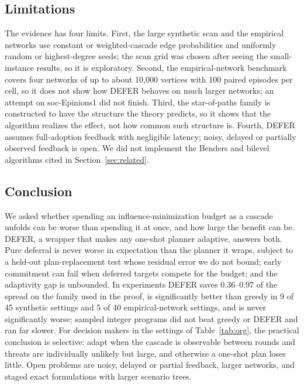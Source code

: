 \documentclass[preprint,11pt]{elsarticle}
\theoremstyle{definition}
\theoremstyle{remark}
\begin{document}
\subsection{Limitations}\label{sec:limitations}

The evidence has four limits. First, the large synthetic scan and the empirical networks use constant or weighted-cascade edge probabilities and uniformly random or highest-degree seeds; the scan grid was chosen after seeing the small-instance results, so it is exploratory. Second, the empirical-network benchmark covers four networks of up to about 10,000 vertices with 100 paired episodes per cell, so it does not show how DEFER behaves on much larger networks; an attempt on soc-Epinions1 did not finish. Third, the star-of-paths family is constructed to have the structure the theory predicts, so it shows that the algorithm realizes the effect, not how common such structure is. Fourth, DEFER assumes full-adoption feedback with negligible latency; noisy, delayed or partially observed feedback is open. We did not implement the Benders and bilevel algorithms cited in Section~\ref{sec:related}.

\subsection{Conclusion}\label{sec:conclusion}

We asked whether spending an influence-minimization budget as a cascade unfolds can be worse than spending it at once, and how large the benefit can be. DEFER, a wrapper that makes any one-shot planner adaptive, answers both. Pure deferral is never worse in expectation than the planner it wraps, subject to a held-out plan-replacement test whose residual error we do not bound; early commitment can fail when deferred targets compete for the budget; and the adaptivity gap is unbounded. In experiments DEFER saves $0.36$--$0.97$ of the spread on the family used in the proof, is significantly better than greedy in 9 of 45 synthetic settings and 5 of 40 empirical-network settings, and is never significantly worse; sampled integer programs did not beat greedy or DEFER and ran far slower. For decision makers in the settings of Table~\ref{tab:org}, the practical conclusion is selective: adapt when the cascade is observable between rounds and threats are individually unlikely but large, and otherwise a one-shot plan loses little. Open problems are noisy, delayed or partial feedback, larger networks, and staged exact formulations with larger scenario trees.
\end{document}

